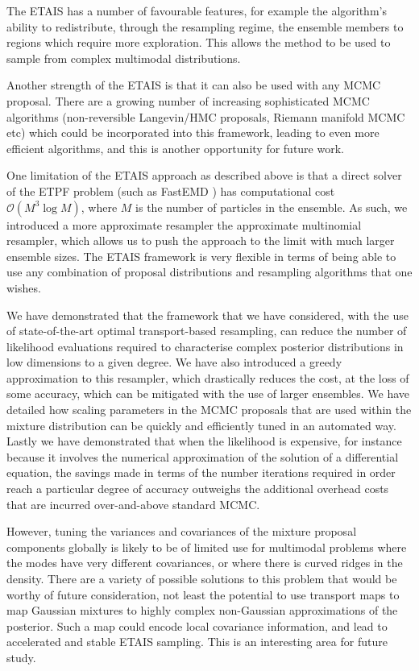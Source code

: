 \documentclass[final]{siamltex}
\begin{document}
The ETAIS has a number of favourable features, for example the
algorithm's ability to redistribute, through the resampling regime,
the ensemble members to regions which require more exploration. This allows the
method to be used to sample from complex multimodal distributions.

Another strength of the ETAIS is that it can also be used with any MCMC
proposal. There are a growing number of increasing sophisticated MCMC
algorithms (non-reversible Langevin/HMC proposals, Riemann manifold MCMC etc) which could be
incorporated into this framework, leading to even more efficient
algorithms, and this is another opportunity for future work. 

One limitation of the ETAIS approach as described above is that a
direct solver of the ETPF problem (such as FastEMD \cite{FastEMD}) has computational cost
$\mathcal{O}(M^3\log M)$, where $M$ is the number of particles in the
ensemble. As such, we introduced a more approximate resampler the
approximate multinomial resampler, which allows us to push the
approach to the limit
with much larger ensemble sizes. The ETAIS framework is very flexible
in terms of being able to use any combination of proposal
distributions and resampling algorithms that one wishes.

We have demonstrated that the framework that we have considered, with
the use of state-of-the-art optimal transport-based resampling, can
reduce the number of likelihood evaluations required to characterise
complex posterior distributions in low dimensions to a given
degree. We have also introduced a greedy approximation to this
resampler, which drastically reduces the cost, at the loss of some
accuracy, which can be mitigated with the use of larger
ensembles. We have detailed how scaling parameters in the MCMC
proposals that are used within the mixture distribution can be quickly
and efficiently
tuned in an automated way. Lastly we have demonstrated that when the
likelihood is expensive, for instance because it involves the
numerical approximation of the solution of a differential equation, the savings made in terms of the number
iterations required in order reach a particular degree of accuracy
outweighs the additional overhead costs that are incurred
over-and-above standard MCMC.

However, tuning the variances and
covariances of the mixture proposal components
globally is likely to be of limited use for multimodal problems where
the modes have very different covariances, or where there is curved
ridges in the density. There are a variety of possible solutions to
this problem that would be worthy of future consideration, not least
the potential to use transport maps\cite{el2012bayesian,parno2014transport} to map Gaussian mixtures to
highly complex non-Gaussian approximations of the posterior. Such a
map could encode local covariance information, and lead to accelerated
and stable ETAIS sampling. This is an interesting area for future study.
\end{document}
